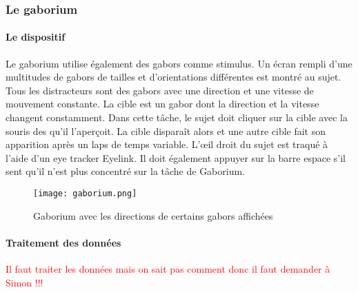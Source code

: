 \subsubsection{Le gaborium}

\paragraph{Le dispositif}Le gaborium utilise également des \glspl{gabor} comme stimulus. Un écran rempli d'une multitudes de gabors de tailles et d'orientations différentes est montré
au sujet. Tous les distracteurs sont des gabors avec une direction et une vitesse de mouvement constante. La cible est un gabor dont la direction et la vitesse changent constamment.
Dans cette tâche, le sujet doit cliquer sur la cible avec la souris des qu'il l'aperçoit. La cible disparaît alors et une autre cible fait son apparition après un laps de temps
variable. L'œil droit du sujet est traqué à l'aide d'un eye tracker Eyelink. Il doit également appuyer sur la barre espace s'il sent qu'il n'est plus concentré sur la tâche de Gaborium.

\begin{figure}[H]
    \begin{center}
    \texttt{[image: gaborium.png]}
    \end{center}
    \caption{Gaborium avec les directions de certains gabors affichées}
\label{Gaborium}
\end{figure}

\paragraph{Traitement des données}\textcolor{red}{Il faut traiter les données mais on sait pas comment donc il faut demander à Simon !!!}